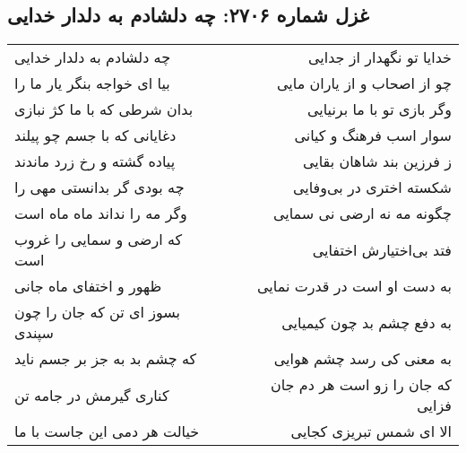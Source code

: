 \begin{center}
\section*{غزل شماره ۲۷۰۶: چه دلشادم به دلدار خدایی}
\label{sec:2706}
\begin{longtable}{l p{0.5cm} r}
چه دلشادم به دلدار خدایی
&&
خدایا تو نگهدار از جدایی
\\
بیا ای خواجه بنگر یار ما را
&&
چو از اصحاب و از یاران مایی
\\
بدان شرطی که با ما کژ نبازی
&&
وگر بازی تو با ما برنیایی
\\
دغایانی که با جسم چو پیلند
&&
سوار اسب فرهنگ و کیانی
\\
پیاده گشته و رخ زرد ماندند
&&
ز فرزین بند شاهان بقایی
\\
چه بودی گر بدانستی مهی را
&&
شکسته اختری در بی‌وفایی
\\
وگر مه را نداند ماه ماه است
&&
چگونه مه نه ارضی نی سمایی
\\
که ارضی و سمایی را غروب است
&&
فتد بی‌اختیارش اختفایی
\\
ظهور و اختفای ماه جانی
&&
به دست او است در قدرت نمایی
\\
بسوز ای تن که جان را چون سپندی
&&
به دفع چشم بد چون کیمیایی
\\
که چشم بد به جز بر جسم ناید
&&
به معنی کی رسد چشم هوایی
\\
کناری گیرمش در جامه تن
&&
که جان را زو است هر دم جان فزایی
\\
خیالت هر دمی این جاست با ما
&&
الا ای شمس تبریزی کجایی
\\
\end{longtable}
\end{center}
